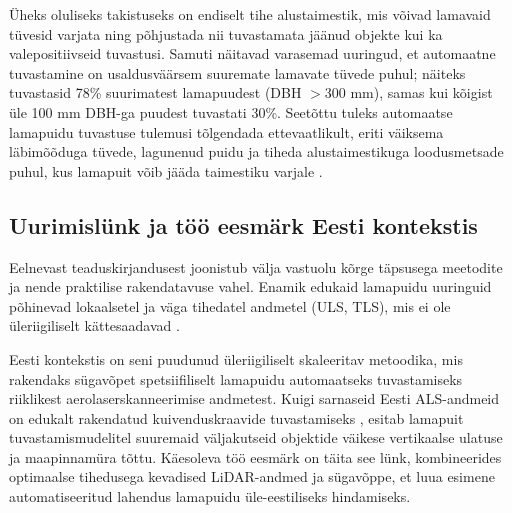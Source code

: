 Üheks oluliseks takistuseks on endiselt tihe alustaimestik, mis võivad lamavaid tüvesid varjata ning põhjustada nii tuvastamata jäänud objekte kui ka valepositiivseid tuvastusi. Samuti näitavad varasemad uuringud, et automaatne tuvastamine on usaldusväärsem suuremate lamavate tüvede puhul; näiteks \textcite{heinaro_airborne_2021} tuvastasid 78\% suurimatest lamapuudest (DBH $>300$ mm), samas kui kõigist üle 100 mm DBH-ga puudest tuvastati 30\%. Seetõttu tuleks automaatse lamapuidu tuvastuse tulemusi tõlgendada ettevaatlikult, eriti väiksema läbimõõduga tüvede, lagunenud puidu ja tiheda alustaimestikuga loodusmetsade puhul, kus lamapuit võib jääda taimestiku varjale \parencite{marchi_airborne_2018,heinaro_airborne_2021,heinaro_evaluating_2023}.
\subsection{Uurimislünk ja töö eesmärk Eesti kontekstis}

Eelnevast teaduskirjandusest joonistub välja vastuolu kõrge täpsusega meetodite ja nende praktilise rakendatavuse vahel. Enamik edukaid lamapuidu uuringuid põhinevad lokaalsetel ja väga tihedatel andmetel (ULS, TLS), mis ei ole üleriigiliselt kättesaadavad \parencite{heinaro_airborne_2021, dietenberger_accurate_2025}. 

Eesti kontekstis on seni puudunud üleriigiliselt skaleeritav metoodika, mis rakendaks sügavõpet spetsiifiliselt lamapuidu automaatseks tuvastamiseks riiklikest aerolaserskanneerimise andmetest. Kuigi sarnaseid Eesti ALS-andmeid on edukalt rakendatud kuivenduskraavide tuvastamiseks \parencite{virro_detection_2025}, esitab lamapuit tuvastamismudelitel suuremaid väljakutseid objektide väikese vertikaalse ulatuse ja maapinnamüra tõttu. Käesoleva töö eesmärk on täita see lünk, kombineerides optimaalse tihedusega kevadised LiDAR-andmed ja sügavõppe, et luua esimene automatiseeritud lahendus lamapuidu üle-eestiliseks hindamiseks.
